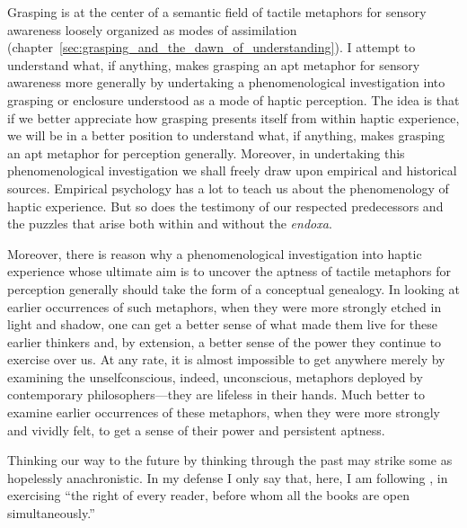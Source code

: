 Grasping is at the center of a semantic field of tactile metaphors for sensory awareness loosely organized as modes of assimilation (chapter~\ref{sec:grasping_and_the_dawn_of_understanding}). I attempt to understand what, if anything, makes grasping an apt metaphor for sensory awareness more generally by undertaking a phenomenological investigation into grasping or enclosure understood as a mode of haptic perception. The idea is that if we better appreciate how grasping presents itself from within haptic experience, we will be in a better position to understand what, if anything, makes grasping an apt metaphor for perception generally. Moreover, in undertaking this phenomenological investigation we shall freely draw upon empirical and historical sources. Empirical psychology has a lot to teach us about the phenomenology of haptic experience. But so does the testimony of our respected predecessors and the puzzles that arise both within and without the \emph{endoxa}.

Moreover, there is reason why a phenomenological investigation into haptic experience whose ultimate aim is to uncover the aptness of tactile metaphors for perception generally should take the form of a conceptual genealogy. In looking at earlier occurrences of such metaphors, when they were more strongly etched in light and shadow, one can get a better sense of what made them live for these earlier thinkers and, by extension, a better sense of the power they continue to exercise over us. At any rate, it is almost impossible to get anywhere merely by examining the unselfconscious, indeed, unconscious, metaphors deployed by contemporary philosophers---they are lifeless in their hands. Much better to examine earlier occurrences of these metaphors, when they were more strongly and vividly felt, to get a sense of their power and persistent aptness.

Thinking our way to the future by thinking through the past may strike some as hopelessly anachronistic. In my defense I only say that, here, I am following \citet[xvii]{Ricoeur:2004ax}, in exercising ``the right of every reader, before whom all the books are open simultaneously.''

